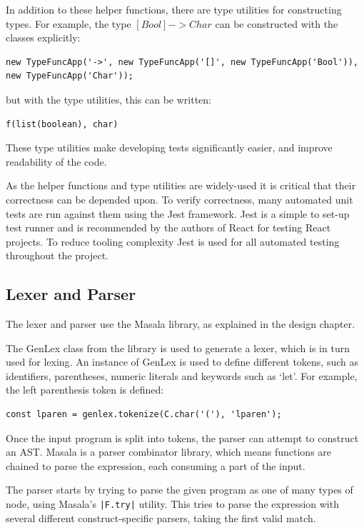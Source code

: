 \documentclass[a4paper,fleqn,twoside,12pt]{report}
\begin{document}
In addition to these helper functions, there are type utilities for constructing types. For example, the type $[Bool] -> Char$ can be constructed with the classes explicitly:

\begin{verbatim}
new TypeFuncApp('->', new TypeFuncApp('[]', new TypeFuncApp('Bool')), new TypeFuncApp('Char'));
\end{verbatim}

but with the type utilities, this can be written:

\begin{verbatim}
f(list(boolean), char)
\end{verbatim}

These type utilities make developing tests significantly easier, and improve readability of the code.

As the helper functions and type utilities are widely-used it is critical that their correctness can be depended upon. To verify correctness, many automated unit tests are run against them using the Jest framework. Jest is a simple to set-up test runner and is recommended by the authors of React for testing React projects. To reduce tooling complexity Jest is used for all automated testing throughout the project.
\subsection{Lexer and Parser}\label{id:h.qbtwwllp8tw6}
The lexer and parser use the Masala library, as explained in the design chapter.

The GenLex class from the library is used to generate a lexer, which is in turn used for lexing. An instance of GenLex is used to define different tokens, such as identifiers, parentheses, numeric literals and keywords such as ‘let’. For example, the left parenthesis token is defined:

\begin{verbatim}
const lparen = genlex.tokenize(C.char('('), 'lparen');
\end{verbatim}

Once the input program is split into tokens, the parser can attempt to construct an AST. Masala is a parser combinator library, which means functions are chained to parse the expression, each consuming a part of the input.

The parser starts by trying to parse the given program as one of many types of node, using Masala’s \texttt{|F.try|} utility. This tries to parse the expression with several different construct-specific parsers, taking the first valid match.
\end{document}

